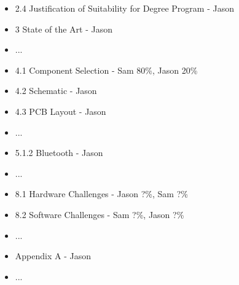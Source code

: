\begin{itemize}
    \item 2.4 Justification of Suitability for Degree Program - Jason
    \item 3 State of the Art - Jason
    \item ...
    \item 4.1 Component Selection - Sam 80\%, Jason 20\%
    \item 4.2 Schematic - Jason
    \item 4.3 PCB Layout - Jason
    \item ...
    \item 5.1.2 Bluetooth - Jason
    \item ...
    \item 8.1 Hardware Challenges - Jason ?\%, Sam ?\%
    \item 8.2 Software Challenges - Sam ?\%, Jason ?\%
    \item ...
    \item Appendix A - Jason
    \item ...
\end{itemize}